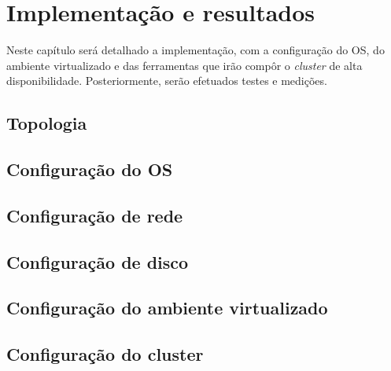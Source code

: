 \chapter{Implementação e resultados}
\label{cap:implementacaoresultados}

Neste capítulo será detalhado a implementação, com a configuração do \ac{OS}, do ambiente virtualizado e das ferramentas que irão compôr o
\textit{cluster} de alta disponibilidade. Posteriormente, serão efetuados testes e medições.

\section{Topologia}


\section{Configuração do \ac{OS}}


\section{Configuração de rede}


\section{Configuração de disco}


\section{Configuração do ambiente virtualizado}


\section{Configuração do cluster}

